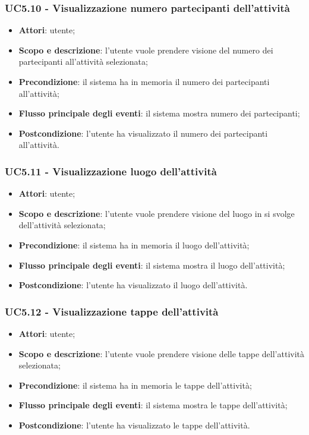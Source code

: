 \subsubsection{UC5.10 - Visualizzazione numero partecipanti dell’attività }
\begin{itemize}
	\item \textbf{Attori}: utente;
	\item \textbf{Scopo e descrizione}: l’utente vuole prendere visione del numero dei partecipanti all'attività selezionata;
	\item \textbf{Precondizione}: il sistema ha in memoria il numero dei partecipanti all'attività;
	\item \textbf{Flusso principale degli eventi}: il sistema mostra numero dei partecipanti;
	\item \textbf{Postcondizione}: l’utente ha visualizzato il numero dei partecipanti all'attività.
\end{itemize}
\subsubsection{UC5.11 - Visualizzazione luogo dell’attività }
\begin{itemize}
	\item \textbf{Attori}: utente;
	\item \textbf{Scopo e descrizione}: l’utente vuole prendere visione del luogo in si svolge dell’attività selezionata;
	\item \textbf{Precondizione}: il sistema ha in memoria il luogo dell’attività;
	\item \textbf{Flusso principale degli eventi}: il sistema mostra il luogo dell’attività;
	\item \textbf{Postcondizione}: l’utente ha visualizzato il luogo dell’attività.
\end{itemize}
\subsubsection{UC5.12 - Visualizzazione tappe dell’attività }
\begin{itemize}
	\item \textbf{Attori}: utente;
	\item \textbf{Scopo e descrizione}: l’utente vuole prendere visione delle tappe dell'attività selezionata;
	\item \textbf{Precondizione}: il sistema ha in memoria le tappe dell'attività;
	\item \textbf{Flusso principale degli eventi}: il sistema mostra le tappe dell'attività;
	\item \textbf{Postcondizione}: l’utente ha visualizzato le tappe dell'attività.
\end{itemize}

